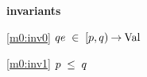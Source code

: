 \textbf{invariants}
\begin{block}
\item[ \eqref{m0:inv0} ]$qe \; \in \; [p,q) \mathbin\rightarrow \text{Val} $ %
\item[ \eqref{m0:inv1} ]$p \; \le \; q $ %
\end{block}
